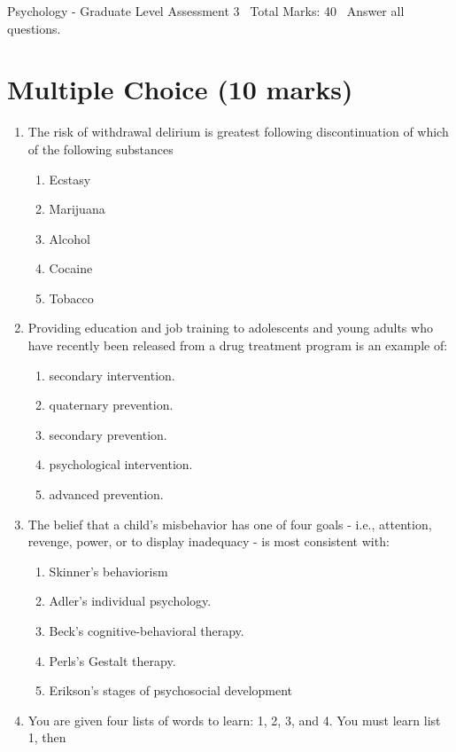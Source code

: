 \documentclass[12pt]{article}
\begin{document}
\begin{center}
Psychology - Graduate Level Assessment 3 \
Total Marks: 40 \
Answer all questions.
\end{center}

\section*{Multiple Choice (10 marks)}
\begin{enumerate}[label=\arabic*.]
\item The risk of withdrawal delirium is greatest following discontinuation of which of the
following substances
\begin{enumerate}[label=(\alph*)]
    \item Ecstasy
    \item Marijuana
    \item Alcohol
    \item Cocaine
    \item Tobacco
\end{enumerate}
\item Providing education and job training to adolescents and young adults who have recently
been released from a drug treatment program is an example of:
\begin{enumerate}[label=(\alph*)]
    \item secondary intervention.
    \item quaternary prevention.
    \item secondary prevention.
    \item psychological intervention.
    \item advanced prevention.
\end{enumerate}
\item The belief that a child's misbehavior has one of four goals - i.e., attention, revenge,
power, or to display inadequacy - is most consistent with:
\begin{enumerate}[label=(\alph*)]
    \item Skinner's behaviorism
    \item Adler's individual psychology.
    \item Beck's cognitive-behavioral therapy.
    \item Perls's Gestalt therapy.
    \item Erikson's stages of psychosocial development
\end{enumerate}
\item You are given four lists of words to learn: 1, 2, 3, and 4. You must learn list 1, then

\end{enumerate}
\end{document}
